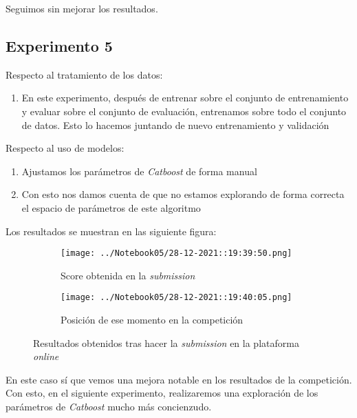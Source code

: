 \documentclass[11pt]{article}
\begin{document}
Seguimos sin mejorar los resultados.

\pagebreak

\subsection{Experimento 5}

Respecto al tratamiento de los datos:

\begin{enumerate}
    \item En este experimento, después de entrenar sobre el conjunto de entrenamiento y evaluar sobre el conjunto de evaluación, entrenamos sobre todo el conjunto de datos. Esto lo hacemos juntando de nuevo entrenamiento y validación
\end{enumerate}

Respecto al uso de modelos:

\begin{enumerate}
    \item Ajustamos los parámetros de \emph{Catboost} de forma manual
    \item Con esto nos damos cuenta de que no estamos explorando de forma correcta el espacio de parámetros de este algoritmo
\end{enumerate}

Los resultados se muestran en las siguiente figura:

\begin{figure}[H]
    \centering

    \begin{subfigure}[b]{0.45 \textwidth}
        \texttt{[image: ../Notebook05/28-12-2021::19:39:50.png]}
        \caption{Score obtenida en la \emph{submission}}
    \end{subfigure}
    \begin{subfigure}[b]{0.45 \textwidth}
        \texttt{[image: ../Notebook05/28-12-2021::19:40:05.png]}
        \caption{Posición de ese momento en la competición}
    \end{subfigure}

    \caption{Resultados obtenidos tras hacer la \emph{submission} en la plataforma \emph{online}}
\end{figure}

En este caso sí que vemos una mejora notable en los resultados de la competición. Con esto, en el siguiente experimento, realizaremos una exploración de los parámetros de \emph{Catboost} mucho más concienzudo.
\end{document}
